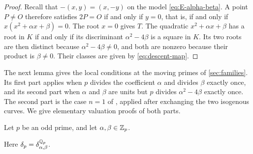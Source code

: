 \begin{proof}
Recall that $-(x,y)=(x,-y)$ on the model \eqref{eq:E-alpha-beta}. A point $P\ne O$ therefore satisfies $2P=O$ if and only if $y=0$, that is, if and only if $x(x^2+\alpha x+\beta)=0$. The root $x=0$ gives $T$. The quadratic $x^2+\alpha x+\beta$ has a root in $K$ if and only if its discriminant $\alpha^2-4\beta$ is a square in $K$. Its two roots are then distinct because $\alpha^2-4\beta\ne0$, and both are nonzero because their product is $\beta\ne0$. Their classes are given by \eqref{eq:descent-map}.
\end{proof}

The next lemma gives the local conditions at the moving primes of \cref{sec:families}. Its first part applies when $p$ divides the coefficient $\alpha$ and divides $\beta$ exactly once, and its second part when $\alpha$ and $\beta$ are units but $p$ divides $\alpha^2-4\beta$ exactly once. The second part is the case $n=1$ of \cite[Lemma~3.3(i)]{Zywina2026}, applied after exchanging the two isogenous curves. We give elementary valuation proofs of both parts.

\begin{lemma}\label{lem:odd-local}
Let $p$ be an odd prime, and let $\alpha,\beta\in\mathbb Z_p$.
Here $\delta_p=\delta^{\mathbb Q_p}_{\alpha,\beta}$.
\end{lemma}

